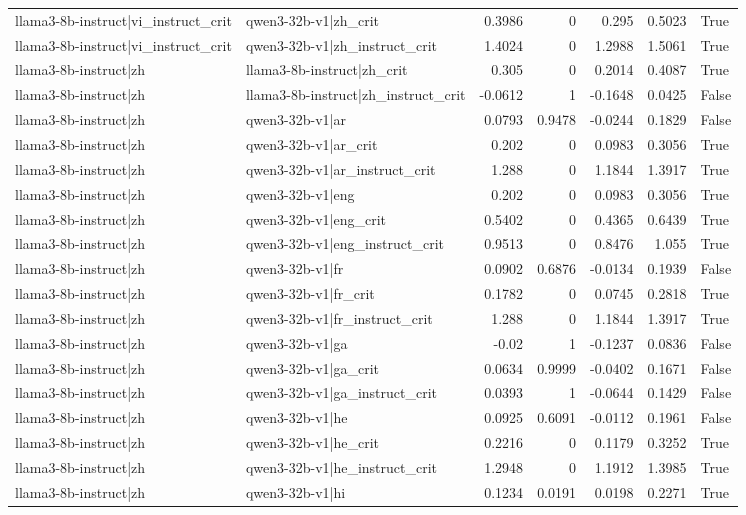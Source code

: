 \begin{table}
\begin{tabular}{l l r r r r l}
llama3-8b-instruct|vi_instruct_crit & qwen3-32b-v1|zh_crit & 0.3986 & 0 & 0.295 & 0.5023 & True \\
llama3-8b-instruct|vi_instruct_crit & qwen3-32b-v1|zh_instruct_crit & 1.4024 & 0 & 1.2988 & 1.5061 & True \\
llama3-8b-instruct|zh & llama3-8b-instruct|zh_crit & 0.305 & 0 & 0.2014 & 0.4087 & True \\
llama3-8b-instruct|zh & llama3-8b-instruct|zh_instruct_crit & -0.0612 & 1 & -0.1648 & 0.0425 & False \\
llama3-8b-instruct|zh & qwen3-32b-v1|ar & 0.0793 & 0.9478 & -0.0244 & 0.1829 & False \\
llama3-8b-instruct|zh & qwen3-32b-v1|ar_crit & 0.202 & 0 & 0.0983 & 0.3056 & True \\
llama3-8b-instruct|zh & qwen3-32b-v1|ar_instruct_crit & 1.288 & 0 & 1.1844 & 1.3917 & True \\
llama3-8b-instruct|zh & qwen3-32b-v1|eng & 0.202 & 0 & 0.0983 & 0.3056 & True \\
llama3-8b-instruct|zh & qwen3-32b-v1|eng_crit & 0.5402 & 0 & 0.4365 & 0.6439 & True \\
llama3-8b-instruct|zh & qwen3-32b-v1|eng_instruct_crit & 0.9513 & 0 & 0.8476 & 1.055 & True \\
llama3-8b-instruct|zh & qwen3-32b-v1|fr & 0.0902 & 0.6876 & -0.0134 & 0.1939 & False \\
llama3-8b-instruct|zh & qwen3-32b-v1|fr_crit & 0.1782 & 0 & 0.0745 & 0.2818 & True \\
llama3-8b-instruct|zh & qwen3-32b-v1|fr_instruct_crit & 1.288 & 0 & 1.1844 & 1.3917 & True \\
llama3-8b-instruct|zh & qwen3-32b-v1|ga & -0.02 & 1 & -0.1237 & 0.0836 & False \\
llama3-8b-instruct|zh & qwen3-32b-v1|ga_crit & 0.0634 & 0.9999 & -0.0402 & 0.1671 & False \\
llama3-8b-instruct|zh & qwen3-32b-v1|ga_instruct_crit & 0.0393 & 1 & -0.0644 & 0.1429 & False \\
llama3-8b-instruct|zh & qwen3-32b-v1|he & 0.0925 & 0.6091 & -0.0112 & 0.1961 & False \\
llama3-8b-instruct|zh & qwen3-32b-v1|he_crit & 0.2216 & 0 & 0.1179 & 0.3252 & True \\
llama3-8b-instruct|zh & qwen3-32b-v1|he_instruct_crit & 1.2948 & 0 & 1.1912 & 1.3985 & True \\
llama3-8b-instruct|zh & qwen3-32b-v1|hi & 0.1234 & 0.0191 & 0.0198 & 0.2271 & True \\

\end{tabular}
\end{table}
